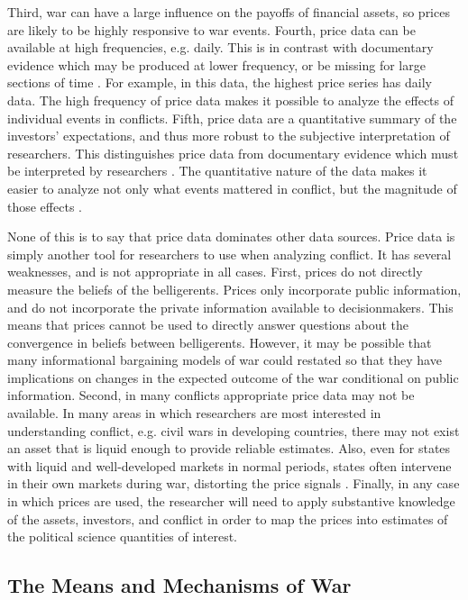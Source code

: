 Third, war can have a large influence on the payoffs of financial assets, so prices are likely to be highly responsive to war events.
Fourth, price data can be available at high frequencies, e.g. daily.
This is in contrast with documentary evidence which may be produced at lower frequency, or be missing for large sections of time \parencite[][57]{Reiter2009}. For example, in this data, the highest price series has daily data. 
The high frequency of price data makes it possible to analyze the effects of individual events in conflicts.
Fifth, price data are a quantitative summary of the investors' expectations, and thus more robust to the subjective interpretation of researchers. 
This distinguishes price data from documentary evidence which must be interpreted by researchers \parencite[][58]{Reiter2009}. 
The quantitative nature of the data makes it easier to analyze not only what events mattered in conflict, but the magnitude of those effects \parencite{north2000introd}.

None of this is to say that price data dominates other data sources.
Price data is simply another tool for researchers to use when analyzing conflict. It has several weaknesses, and is not appropriate in all cases.
First, prices do not directly measure the beliefs of the belligerents. Prices only incorporate public information, and do not incorporate the private information available to decisionmakers. 
This means that prices cannot be used to directly answer questions about the convergence in beliefs between belligerents.
However, it may be possible that many informational bargaining models of war could restated so that they have implications on changes in the expected outcome of the war conditional on public information.
Second, in many conflicts appropriate price data may not be available. 
In many areas in which researchers are most interested in understanding conflict, e.g. civil wars in developing countries, there may not exist an asset that is liquid enough to provide reliable estimates. 
Also, even for states with liquid and well-developed markets in normal periods, states often intervene in their own markets during war, distorting the price signals \parencite[12]{HaberMitchenerOosterlinckEtAl2015}. Finally, in any case in which prices are used, the researcher will need to apply substantive knowledge of the assets, investors, and conflict in order to map the prices into estimates of the political science quantities of interest.




\subsection{The Means and Mechanisms of War}
\label{bonds_battles:sec:means-mechanisms-war}

